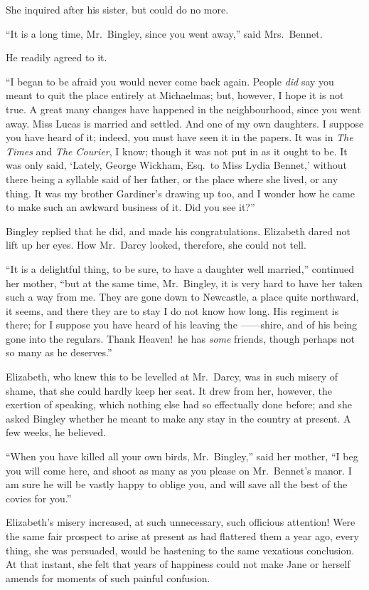 \documentclass[12pt,english,oneside]{book}
\begin{document}
She inquired after his sister, but could do no more.

{}``It is a long time, Mr.\ Bingley, since you went away,'' said
Mrs.\ Bennet.

He readily agreed to it.

{}``I began to be afraid you would never come back again. People
\textit{did} say you meant to quit the place entirely at Michaelmas;
but, however, I hope it is not true. A great many changes have happened
in the neighbourhood, since you went away. Miss Lucas is married and
settled. And one of my own daughters. I suppose you have heard of
it; indeed, you must have seen it in the papers. It was in \emph{The
Times} and \emph{The Courier}, I know; though it was not put in as
it ought to be. It was only said, `Lately, George Wickham, Esq.\ to
Miss Lydia Bennet,' without there being a syllable said of her father,
or the place where she lived, or any thing. It was my brother Gardiner's
drawing up too, and I wonder how he came to make such an awkward business
of it. Did you see it?''\ 

Bingley replied that he did, and made his congratulations. Elizabeth
dared not lift up her eyes. How Mr.\ Darcy looked, therefore, she
could not tell.

{}``It is a delightful thing, to be sure, to have a daughter well
married,'' continued her mother, {}``but at the same time, Mr.\ Bingley,
it is very hard to have her taken such a way from me. They are gone
down to Newcastle, a place quite northward, it seems, and there they
are to stay I do not know how long. His regiment is there; for I suppose
you have heard of his leaving the \mbox{------}shire, and of his
being gone into the regulars. Thank Heaven!\ he has \textit{some}
friends, though perhaps not so many as he deserves.''

Elizabeth, who knew this to be levelled at Mr.\ Darcy, was in such
misery of shame, that she could hardly keep her seat. It drew from
her, however, the exertion of speaking, which nothing else had so
effectually done before; and she asked Bingley whether he meant to
make any stay in the country at present. A few weeks, he believed.

{}``When you have killed all your own birds, Mr.\ Bingley,'' said
her mother, {}``I beg you will come here, and shoot as many as you
please on Mr.\ Bennet's manor. I am sure he will be vastly happy
to oblige you, and will save all the best of the covies for you.''

Elizabeth's misery increased, at such unnecessary, such officious
attention! Were the same fair prospect to arise at present as had
flattered them a year ago, every thing, she was persuaded, would be
hastening to the same vexatious conclusion. At that instant, she felt
that years of happiness could not make Jane or herself amends for
moments of such painful confusion.
\end{document}
